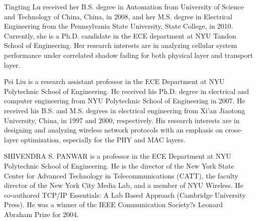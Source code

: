 \documentclass[journal,10pt]{IEEEtran}
\begin{document}
%
%
%
%
%
%
%



\ifCLASSOPTIONcaptionsoff
  \newpage
\fi




\begin{IEEEbiography}{Tingting Lu}
received her B.S. degree in Automation from University of Science and Technology of China, 
China, in 2008, and her M.S. degree in Electrical Engineering from the Pennsylvania State University, 
State College, in 2010. Currently, she is a Ph.D. candidate in the ECE department at NYU 
Tandon School of Engineering. Her research interests are in analyzing cellular system performance 
under correlated shadow fading for both physical layer and transport layer.
\end{IEEEbiography}
\begin{IEEEbiography}{Pei Liu}
is a research assistant professor in the ECE Department
at NYU Polytechnic School of Engineering. He
received his Ph.D. degree in electrical and computer engineering
from NYU Polytechnic School of Engineering in
2007. He received his B.S. and M.S. degrees in electrical
engineering from Xi'an Jiaotong University, China, in 1997
and 2000, respectively. His research interests are in designing
and analyzing wireless network protocols with an
emphasis on cross-layer optimization, especially for the
PHY and MAC layers.
\end{IEEEbiography}
\begin{IEEEbiography}{SHIVENDRA S. PANWAR}
 is a professor in the ECE Department
at NYU Polytechnic School of Engineering. He is the
director of the New York State Center for Advanced Technology
in Telecommunications (CATT), the faculty director
of the New York City Media Lab, and a member of NYU
Wireless. He co-authored TCP/IP Essentials: A Lab Based
Approach (Cambridge University Press). He was a winner of
the IEEE Communication Society?s Leonard Abraham Prize
for 2004.
\end{IEEEbiography}
\end{document}
